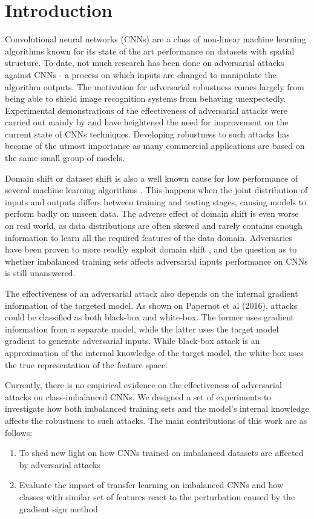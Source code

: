 \documentclass[runningheads,a4paper]{llncs}
\begin{document}
\section{Introduction}


Convolutional neural networks (CNNs) are a class of non-linear machine learning algorithms known for its state of the art performance on datasets with spatial structure. To date, not much research has been done on adversarial attacks against CNNs - a process on which inputs are changed to manipulate the algorithm outputs. The motivation for adversarial robustness comes largely from being able to shield image recognition systems from behaving unexpectedly. Experimental demonstrations of the effectiveness of adversarial attacks were carried out mainly by \cite{billovits,goodfellow2014,papernot2016} and have heightened the need for improvement on the current state of CNNs techniques. Developing robustness to such attacks has become of the utmost importance as many commercial applications are based on the same small group of models.

Domain shift or dataset shift \cite{Quionero} is also a well known cause for low performance of several machine learning algorithms \cite{japkowicz2002class,krawczyk2016learning}. This happens when the joint distribution of inputs and outputs differs between training and testing stages, causing models to perform badly on unseen data. The adverse effect of domain shift is even worse on real world, as data distributions are often skewed and rarely contains enough information to learn all the required features of the data domain. Adversaries have been proven to more readily exploit domain shift \cite{Laskov2010,lowd2005}, and the question as to whether imbalanced training sets affects adversarial inputs performance on CNNs is still unanswered. 

The effectiveness of an adversarial attack also depends on the internal gradient information of the targeted model. As shown on Papernot et al (2016), attacks could be classified as both black-box and white-box. The former uses gradient information from a separate model, while the latter uses the target model gradient to generate adversarial inputs. While black-box attack is an approximation of the internal knowledge of the target model, the white-box uses the true representation of the feature space.

Currently, there is no empirical evidence on the effectiveness of adversarial attacks on class-imbalanced CNNs. We designed a set of experiments to investigate how both imbalanced training sets and the model's internal knowledge affects the robustness to such attacks. The main contributions of this work are as follows: 
\begin{enumerate}
	\item To shed new light on how CNNs trained on imbalanced datasets are affected by adversarial attacks
	\item Evaluate the impact of transfer learning on imbalanced CNNs and how classes with similar set of features react to the perturbation caused by the gradient sign method
\end{enumerate}
\end{document}
